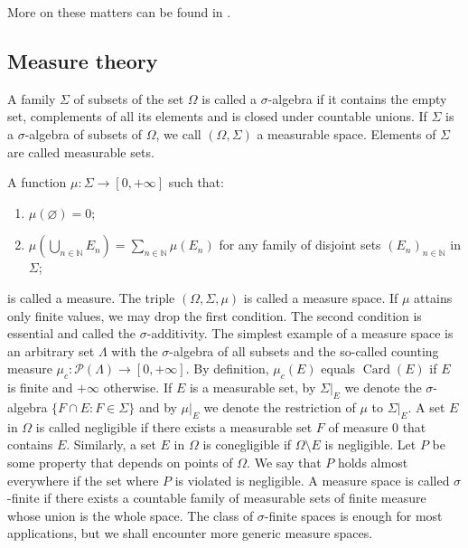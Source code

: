 More on these matters can be found in \cite[section 7]{BourbElemMathGenTopLivIII}.



\subsection{
  Measure theory}\label{SubSectionMeasureTheory}

A family $\Sigma$ of subsets of the set $\Omega$ is called a $\sigma$-algebra if
it contains the empty set, complements of all its elements and is closed
under countable unions. If $\Sigma$ is a $\sigma$-algebra of subsets of $\Omega$,
we call $(\Omega,\Sigma)$ a measurable space. Elements of $\Sigma$ are called
measurable sets. 

A function $\mu:\Sigma\to[0,+\infty]$ such that:  
\begin{enumerate}[label = (\roman*)]
  \item $\mu(\varnothing)=0$; 

  \item $\mu\left(\bigcup\limits_{n\in\mathbb{N}} E_n\right)
  =\sum\limits_{n\in\mathbb{N}}\mu(E_n)$ for any family of disjoint sets
  ${(E_n)}_{n\in\mathbb{N}}$ in $\Sigma$; 
\end{enumerate}
is called a measure. The triple $(\Omega,\Sigma,\mu)$ is called a measure space.
If $\mu$ attains only finite values, we may drop the first condition. The second
condition is essential and called the $\sigma$-additivity. The simplest example
of a measure space is an  arbitrary set $\Lambda$ with the $\sigma$-algebra of all
subsets and the so-called counting measure
$\mu_c:\mathcal{P}(\Lambda)\to[0,+\infty]$. By definition, $\mu_c(E)$ equals
$\operatorname{Card}(E)$ if $E$ is finite and $+\infty$ otherwise. If $E$ is a
measurable set, by $\Sigma|_E$ we denote the $\sigma$-algebra $ \{F\cap
E:F\in\Sigma \}$ and by $\mu|_E$ we denote the restriction of $\mu$ to
$\Sigma|_E$. A set $E$ in $\Omega$ is called negligible if there exists a
measurable set $F$ of measure $0$ that contains $E$. Similarly, a set $E$ in
$\Omega$ is conegligible if $\Omega\setminus E$ is negligible. Let $P$ be some
property that depends on points of $\Omega$. We say that $P$ holds almost
everywhere if the set where $P$ is violated is negligible. A measure space is
called $\sigma$-finite if there exists a countable family of measurable sets of
finite measure whose union is the whole space. The class of $\sigma$-finite
spaces is enough for most applications, but we shall encounter more generic
measure spaces.

